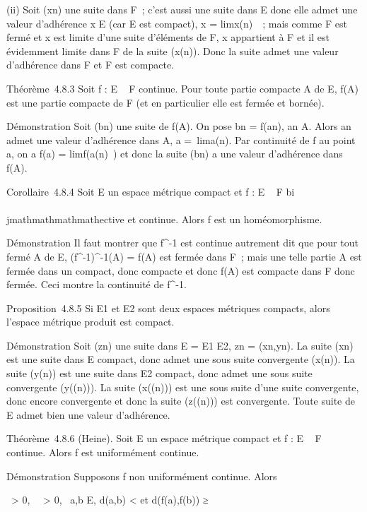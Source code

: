 (ii) Soit (xn) une suite dans F~; c'est aussi une suite dans E
donc elle admet une valeur d'adhérence x \in E (car E est compact), x
= limx\phi(n)~~; mais comme F est fermé
et x est limite d'une suite d'éléments de F, x appartient à F et il est
évidemment limite dans F de la suite (x\phi(n)). Donc la suite
admet une valeur d'adhérence dans F et F est compacte.

Théorème~4.8.3 Soit f : E \rightarrow~ F continue. Pour toute partie compacte A de
E, f(A) est une partie compacte de F (et en particulier elle est fermée
et bornée).

Démonstration Soit (bn) une suite de f(A). On pose
bn = f(an), an \in A. Alors an
admet une valeur d'adhérence dans A, a =\
lima\phi(n). Par continuité de f au point a, on a f(a)
= limf(a\phi(n)~) et donc la suite
(bn) a une valeur d'adhérence dans f(A).

Corollaire~4.8.4 Soit E un espace métrique compact et f : E \rightarrow~ F
bi\\\\jmathmathmathmathective et continue. Alors f est un homéomorphisme.

Démonstration Il faut montrer que f^-1 est continue autrement
dit que pour tout fermé A de E, (f^-1)^-1(A) =
f(A) est fermée dans F~; mais une telle partie A est fermée dans un
compact, donc compacte et donc f(A) est compacte dans F donc fermée.
Ceci montre la continuité de f^-1.

Proposition~4.8.5 Si E1 et E2 sont deux espaces
métriques compacts, alors l'espace métrique produit est compact.

Démonstration Soit (zn) une suite dans E = E1 \times
E2, zn = (xn,yn). La suite
(xn) est une suite dans E compact, donc admet une sous suite
convergente (x\phi(n)). La suite (y\phi(n)) est une suite
dans E2 compact, donc admet une sous suite convergente
(y\phi(\psi(n))). La suite (x\phi(\psi(n))) est une sous suite
d'une suite convergente, donc encore convergente et donc la suite
(z\phi(\psi(n))) est convergente. Toute suite de E admet bien une
valeur d'adhérence.

Théorème~4.8.6 (Heine). Soit E un espace métrique compact et f : E \rightarrow~ F
continue. Alors f est uniformément continue.

Démonstration Supposons f non uniformément continue. Alors

\exists~\epsilon \textgreater{} 0,
\forall~~\eta \textgreater{} 0,\quad
\exists~a,b \in E, d(a,b) \textless{}
\eta\text et d(f(a),f(b)) ≥ \epsilon

